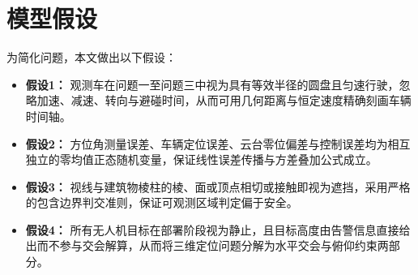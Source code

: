 
\section{模型假设}

为简化问题，本文做出以下假设：

\begin{itemize}[itemindent=2em]
\item \textbf{假设1：} 观测车在问题一至问题三中视为具有等效半径的圆盘且匀速行驶，忽略加速、减速、转向与避碰时间，从而可用几何距离与恒定速度精确刻画车辆时间轴。
\item \textbf{假设2：} 方位角测量误差、车辆定位误差、云台零位偏差与控制误差均为相互独立的零均值正态随机变量，保证线性误差传播与方差叠加公式成立。
\item \textbf{假设3：} 视线与建筑物棱柱的棱、面或顶点相切或接触即视为遮挡，采用严格的包含边界判交准则，保证可观测区域判定偏于安全。
\item \textbf{假设4：} 所有无人机目标在部署阶段视为静止，且目标高度由告警信息直接给出而不参与交会解算，从而将三维定位问题分解为水平交会与俯仰约束两部分。
\end{itemize}

